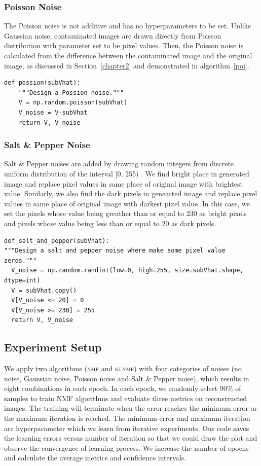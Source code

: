 \subsubsection{Poisson Noise}\label{sec:poi}
The Poisson noise is not additive and has no hyperparameters to be set. Unlike Gaussian noise, contaminated images are drawn directly from Poisson distribution with parameter set to be pixel values. Then, the Poisson noise is calculated from the difference between the contaminated image and the original image, as discussed in Section~\ref{chapter2} and demonstrated in algorithm~\ref{poi}.
\begin{lstlisting}[caption= Poisson Noise Design, label=poi]
def possion(subVhat):
    """Design a Possion noise."""
    V = np.random.poisson(subVhat)
    V_noise = V-subVhat
    return V, V_noise
\end{lstlisting}


\subsubsection{Salt \& Pepper Noise}\label{sec:sal}
Salt \& Pepper noises are added by drawing random integers from discrete uniform distribution of the interval $[$0, 255$)$ . We find bright place in generated image and replace pixel values in same place of original image with brightest value. Similarly, we also find the dark pixels in genearted image and replace pixel values in same place of original image with darkest pixel value. In this case, we set the pixels whose value being greather than or equal to 230 as bright pixels and pixels whose value being less than or equal to 20 as dark pixels.
\begin{lstlisting}[caption= Salt and Pepper Noise Design, label=salt]
def salt_and_pepper(subVhat):
"""Design a salt and pepper noise where make some pixel value zeros."""
  V_noise = np.random.randint(low=0, high=255, size=subVhat.shape, dtype=int)
  V = subVhat.copy()
  V[V_noise <= 20] = 0
  V[V_noise >= 230] = 255
  return V, V_noise
\end{lstlisting}

\subsection{Experiment Setup}

We apply two algorithms (\textsc{nmf} and \textsc{klnmf}) with four categories of noises (no noise, Gaussian noise, Poisson noise and Salt \& Pepper noise), which results in eight combinations in each epoch. In each epoch, we randomly select 90\% of samples to train NMF algorithms and evaluate three metrics on reconstructed images. The training will terminate when the error reaches the minimum error or the maximum iteration is reached. The minimum error and maximum iteration are hyperparameter which we learn from iterative experiments. Our code saves the learning errors versus number of iteration so that we could draw the plot and observe the convergence of learning process. We increase the number of epochs and calculate the average metrics and confidence intervals.


